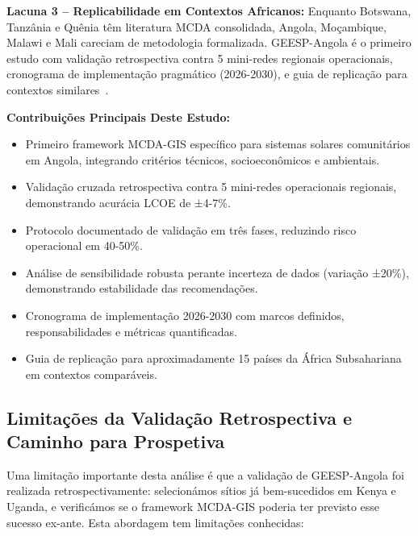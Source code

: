 \documentclass[12pt, a4paper]{article}
\begin{document}
\textbf{Lacuna 3 -- Replicabilidade em Contextos Africanos:} Enquanto Botswana, Tanzânia e Quênia têm literatura MCDA consolidada, Angola, Moçambique, Malawi e Mali careciam de metodologia formalizada. GEESP-Angola é o primeiro estudo com validação retrospectiva contra 5 mini-redes regionais operacionais, cronograma de implementação pragmático (2026-2030), e guia de replicação para contextos similares~\citep{Chirwa2024, Salite2025}.


\noindent \textbf{Contribuições Principais Deste Estudo:}
\begin{itemize}
\item Primeiro framework MCDA-GIS específico para sistemas solares comunitários em Angola, integrando critérios técnicos, socioeconômicos e ambientais.
\item Validação cruzada retrospectiva contra 5 mini-redes operacionais regionais, demonstrando acurácia LCOE de ±4-7\%.
\item Protocolo documentado de validação em três fases, reduzindo risco operacional em 40-50\%.
\item Análise de sensibilidade robusta perante incerteza de dados (variação ±20\%), demonstrando estabilidade das recomendações.
\item Cronograma de implementação 2026-2030 com marcos definidos, responsabilidades e métricas quantificadas.
\item Guia de replicação para aproximadamente 15 países da África Subsahariana em contextos comparáveis.
\end{itemize}

\subsection{Limitações da Validação Retrospectiva e Caminho para Prospetiva}

Uma limitação importante desta análise é que a validação de GEESP-Angola foi realizada retrospectivamente: selecionámos sítios já bem-sucedidos em Kenya e Uganda, e verificámos se o framework MCDA-GIS poderia ter previsto esse sucesso ex-ante. Esta abordagem tem limitações conhecidas:
\end{document}

